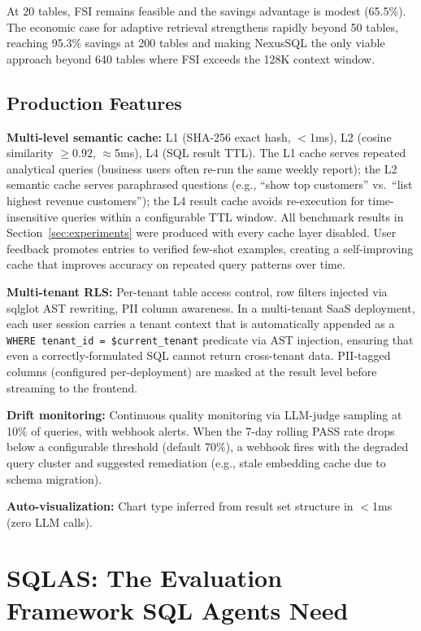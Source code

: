 \documentclass[conference]{IEEEtran}
\begin{document}
At 20 tables, FSI remains feasible and the savings advantage is modest
(65.5\%). The economic case for adaptive retrieval strengthens rapidly
beyond 50 tables, reaching 95.3\% savings at 200 tables and making
NexusSQL the only viable approach beyond 640 tables where FSI exceeds
the 128K context window.

\subsection{Production Features}

\textbf{Multi-level semantic cache:} L1 (SHA-256 exact hash, $<$1ms),
L2 (cosine similarity $\geq 0.92$, $\approx$5ms), L4 (SQL result TTL).
The L1 cache serves repeated analytical queries (business users often
re-run the same weekly report); the L2 semantic cache serves paraphrased
questions (e.g., ``show top customers'' vs.\ ``list highest revenue
customers''); the L4 result cache avoids re-execution for
time-insensitive queries within a configurable TTL window.
All benchmark results in Section~\ref{sec:experiments} were produced
with every cache layer disabled.
User feedback promotes entries to verified few-shot examples,
creating a self-improving cache that improves accuracy on repeated
query patterns over time.

\textbf{Multi-tenant RLS:} Per-tenant table access control, row filters
injected via sqlglot AST rewriting, PII column awareness. In a
multi-tenant SaaS deployment, each user session carries a tenant
context that is automatically appended as a \texttt{WHERE tenant\_id =
\$current\_tenant} predicate via AST injection, ensuring that even
a correctly-formulated SQL cannot return cross-tenant data.
PII-tagged columns (configured per-deployment) are masked at the
result level before streaming to the frontend.

\textbf{Drift monitoring:} Continuous quality monitoring via LLM-judge
sampling at 10\% of queries, with webhook alerts. When the 7-day
rolling PASS rate drops below a configurable threshold (default 70\%),
a webhook fires with the degraded query cluster and suggested remediation
(e.g., stale embedding cache due to schema migration).

\textbf{Auto-visualization:} Chart type inferred from result set structure
in $<$1ms (zero LLM calls).

\section{SQLAS: The Evaluation Framework SQL Agents Need}
\label{sec:sqlas}
\end{document}
